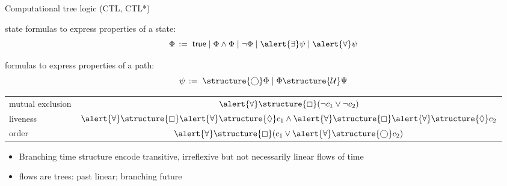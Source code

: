 \documentclass[aspectratio=169]{beamer}
\begin{document}
\begin{slide}{Computational tree logic (CTL, CTL*)}\label{s:45}
\small

 \alert{state} formulas to express  properties of a state:
\[
\Phi\, := \; \true \mid \Phi \wedge \Phi \mid \neg \Phi \mid \alert{\exists} \psi \mid \alert{\forall} \psi
\]


 formulas to express properties of a path:
\[
\psi\, := \; \structure{\nexts} \Phi \mid  \Phi \structure{\until} \Psi
\]

\vspace{0.2cm}
\begin{center}
\begin{tabular}{|l|c|}
\hline
mutual exclusion  & $\alert{\forall} \structure{\always} (\neg c_1 \vee \neg c_2)$ \\
 liveness & $\alert{\forall} \structure{\always} \alert{\forall} \structure{\eventual} c_1 \wedge \alert{\forall} \structure{\always} \alert{\forall}  \structure{\eventual} c_2$\\
order  & $\alert{\forall} \structure{\always} (c_1 \vee \alert{\forall}\structure{\nexts} c_2)$\\
\hline
\end{tabular}  
\end{center}

\begin{itemize}
\item Branching time structure encode transitive, irreflexive but not necessarily linear flows of time
\item flows are \alert{trees}: past linear; branching future
\end{itemize}
\end{slide}
\end{document}

